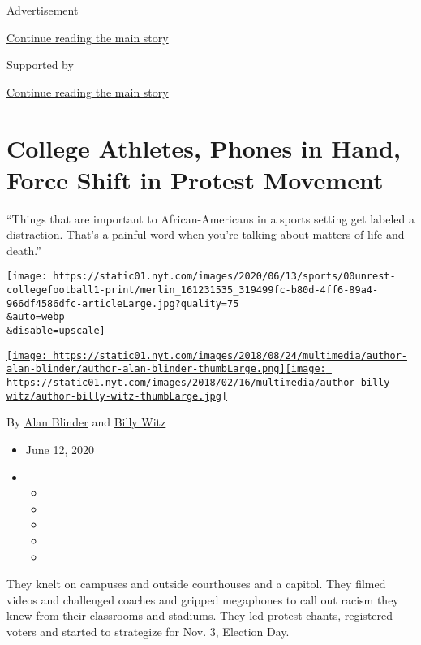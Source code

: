 Advertisement

\protect\hyperlink{after-top}{Continue reading the main story}

Supported by

\protect\hyperlink{after-sponsor}{Continue reading the main story}

\hypertarget{college-athletes-phones-in-hand-force-shift-in-protest-movement}{%
\section{College Athletes, Phones in Hand, Force Shift in Protest
Movement}\label{college-athletes-phones-in-hand-force-shift-in-protest-movement}}

``Things that are important to African-Americans in a sports setting get
labeled a distraction. That's a painful word when you're talking about
matters of life and death.''

\texttt{[image: https://static01.nyt.com/images/2020/06/13/sports/00unrest-collegefootball1-print/merlin\_161231535\_319499fc-b80d-4ff6-89a4-966df4586dfc-articleLarge.jpg?quality=75\\\&auto=webp\\\&disable=upscale]}

\href{https://www.nytimes.com/by/alan-blinder}{\texttt{[image: https://static01.nyt.com/images/2018/08/24/multimedia/author-alan-blinder/author-alan-blinder-thumbLarge.png]}}\href{https://www.nytimes.com/by/billy-witz}{\texttt{[image: https://static01.nyt.com/images/2018/02/16/multimedia/author-billy-witz/author-billy-witz-thumbLarge.jpg]}}

By \href{https://www.nytimes.com/by/alan-blinder}{Alan Blinder} and
\href{https://www.nytimes.com/by/billy-witz}{Billy Witz}

\begin{itemize}
\item
  June 12, 2020
\item
  \begin{itemize}
  \item
  \item
  \item
  \item
  \item
  \end{itemize}
\end{itemize}

They knelt on campuses and outside courthouses and a capitol. They
filmed videos and challenged coaches and gripped megaphones to call out
racism they knew from their classrooms and stadiums. They led protest
chants, registered voters and started to strategize for Nov. 3, Election
Day.

